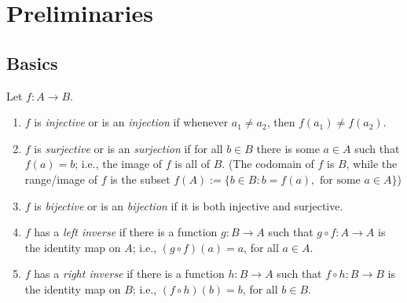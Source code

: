 \chapter*{Preliminaries}

\section{Basics}
Let $f:A\to B$.
\begin{enumerate}[(1)]
        \item $f$ is \textit{injective} or is an \textit{injection} if whenever $a_1\neq a_2$, then $f(a_1)\neq f(a_2)$.
        \item $f$ is \textit{surjective} or is an \textit{surjection} if for all $b\in B$ there is some $a\in A$ such that $f(a)=b$; i.e., the image of $f$ is all of $B$. 
        (The codomain of $f$ is $B$, while the range/image of $f$ is the subset $f(A):=\{b\in B:b=f(a), \text{ for some }a\in A\}$)
        \item $f$ is \textit{bijective} or is an \textit{bijection} if it is both injective and surjective.
        \item $f$ has a \textit{left inverse} if there is a function $g:B\to A$ such that $g\circ f:A\to A$ is the identity map on $A$; i.e., $(g\circ f)(a)=a$, for all $a\in A$.
        \item $f$ has a \textit{right inverse} if there is a function $h:B\to A$ such that $f\circ h:B\to B$ is the identity map on $B$; i.e., $(f\circ h)(b)=b$, for all $b\in B$.
    \end{enumerate}
